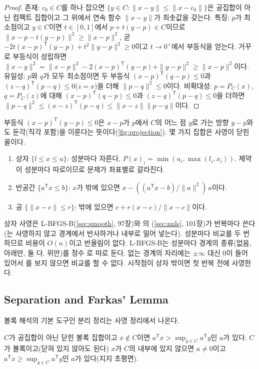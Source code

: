 \begin{proof}
존재: $c_0\in C$를 하나 잡으면 $\{y\in C:\|x-y\|\le\|x-c_0\|\}$은 공집합이 아닌 컴팩트 집합이고 그 위에서 연속 함수 $\|x-y\|$가 최솟값을 갖는다. 특징: $p$가 최소점이고 $y\in C$이면 $t\in[0,1]$에서 $p+t(y-p)\in C$이므로 $\|x-p-t(y-p)\|^2\ge\|x-p\|^2$, 곧 $-2t(x-p)^{\mathsf T}(y-p)+t^2\|y-p\|^2\ge0$이고 $t\to0^+$에서 부등식을 얻는다. 거꾸로 부등식이 성립하면 $\|x-y\|^2=\|x-p\|^2-2(x-p)^{\mathsf T}(y-p)+\|y-p\|^2\ge\|x-p\|^2$이다. 유일성: $p$와 $q$가 모두 최소점이면 두 부등식 $(x-p)^{\mathsf T}(q-p)\le0$과 $(z-q)^{\mathsf T}(p-q)\le0$($z=x$)을 더해 $\|p-q\|^2\le0$이다. 비확대성: $p=P_C(x)$, $q=P_C(z)$에 대해 $(x-p)^{\mathsf T}(q-p)\le0$과 $(z-q)^{\mathsf T}(p-q)\le0$을 더하면 $\|p-q\|^2\le(x-z)^{\mathsf T}(p-q)\le\|x-z\|\|p-q\|$이다.
\end{proof}

부등식 $(x-p)^{\mathsf T}(y-p)\le0$은 $x-p$가 $p$에서 $C$의 어느 점 $y$로 가는 방향 $y-p$와도 둔각(직각 포함)을 이룬다는 뜻이다(\cref{fig:projection}). 몇 가지 집합은 사영이 닫힌 꼴이다.
\begin{enumerate}
\item 상자 $\{l\le x\le u\}$: 성분마다 자른다, $P(x)_i=\min(u_i,\max(l_i,x_i))$. 제약이 성분마다 따로이므로 문제가 좌표별로 갈라진다.
\item 반공간 $\{a^{\mathsf T}x\le b\}$: $x$가 밖에 있으면 $x-((a^{\mathsf T}x-b)/\|a\|^2)\,a$이다.
\item 공 $\{\|x-c\|\le r\}$: 밖에 있으면 $c+r(x-c)/\|x-c\|$이다.
\end{enumerate}
상자 사영은 L-BFGS-B(\cref{sec:smooth}, 97장)와 의 (\cref{sec:nnls}, 101장)가 반복마다 쓴다(는 사영하지 않고 경계에서 반사하거나 내부로 밀어 넣는다). 성분마다 비교를 두 번 하므로 비용이 $O(n)$이고 반올림이 없다. L-BFGS-B는 성분마다 경계의 종류(없음, 아래만, 둘 다, 위만)를 정수 로 따로 둔다. 없는 경계의 자리에는 $\pm\infty$ 대신 $0$이 들어 있어서 를 보지 않으면 비교를 할 수 없다. 시작점이 상자 밖이면 첫 반복 전에 사영한다.

\subsection{Separation and Farkas' Lemma}

볼록 해석의 기본 도구인 분리 정리는 사영 정리에서 나온다.

\begin{theorem}[분리 정리]
\label{thm:separation}
$C$가 공집합이 아닌 닫힌 볼록 집합이고 $x\notin C$이면 $a^{\mathsf T}x>\sup_{y\in C}a^{\mathsf T}y$인 $a$가 있다. $C$가 볼록이고(닫혀 있지 않아도 된다) $x$가 $C$의 내부에 있지 않으면 $a\ne0$이고 $a^{\mathsf T}x\ge\sup_{y\in C}a^{\mathsf T}y$인 $a$가 있다(지지 초평면).
\end{theorem}

